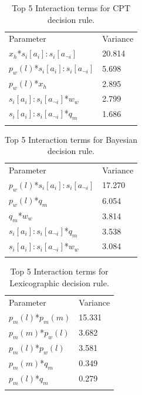 \documentclass[graybox]{svmult}
\begin{document}
\begin{table}[H]
\caption{Top 5 Interaction terms for \ac{CPT} decision rule. \label{tab:sa_interaction_prospect_sig}}
\begin{tabular} {ll}
\hline\noalign{\smallskip}
Parameter & Variance \\ 
\noalign{\smallskip}\svhline\noalign{\smallskip}

\(x_{h}\)*\(s_{i}[a_{i}]:s_{i}[a_{\neg i}]\) & 20.814\\
\(p_{w}(l)\)*\(s_{i}[a_{i}]:s_{i}[a_{\neg i}]\) & 5.698\\
\(p_{w}(l)\)*\(x_{h}\) & 2.895\\
\(s_{i}[a_{i}]:s_{i}[a_{\neg i}]\)*\(w_{w}\) & 2.799\\
\(s_{i}[a_{i}]:s_{i}[a_{\neg i}]\)*\(q_{m}\) & 1.686\\
\noalign{\smallskip}\hline\noalign{\smallskip}
\end{tabular}
\end{table}

\begin{table}[H]
\caption{Top 5 Interaction terms for Bayesian decision rule. \label{tab:sa_interaction_sharing_sig}}
\begin{tabular} {ll}
\hline\noalign{\smallskip}
Parameter & Variance \\
\noalign{\smallskip}\svhline\noalign{\smallskip}
\(p_{w}(l)\)*\(s_{i}[a_{i}]:s_{i}[a_{\neg i}]\) & 17.270\\
\(p_{w}(l)\)*\(q_{m}\) & 6.054\\
\(q_{m}\)*\(w_{w}\) & 3.814\\
\(s_{i}[a_{i}]:s_{i}[a_{\neg i}]\)*\(q_{m}\) & 3.538\\
\(s_{i}[a_{i}]:s_{i}[a_{\neg i}]\)*\(w_{w}\) & 3.084\\
\noalign{\smallskip}\hline\noalign{\smallskip}
\end{tabular}
\end{table}

\begin{table}[H]
\caption{Top 5 Interaction terms for Lexicographic decision rule. \label{tab:sa_interaction_lexic_sig}}
\begin{tabular} {ll}
\hline\noalign{\smallskip}
Parameter & Variance \\
\noalign{\smallskip}\svhline\noalign{\smallskip}
\(p_{m}(l)\)*\(p_{m}(m)\) & 15.331\\
\(p_{m}(m)\)*\(p_{w}(l)\) & 3.682\\
\(p_{m}(l)\)*\(p_{w}(l)\) & 3.581\\
\(p_{m}(m)\)*\(q_{m}\) & 0.349\\
\(p_{m}(l)\)*\(q_{m}\) & 0.279\\
\noalign{\smallskip}\hline\noalign{\smallskip}
\end{tabular}
\end{table}
\end{document}
